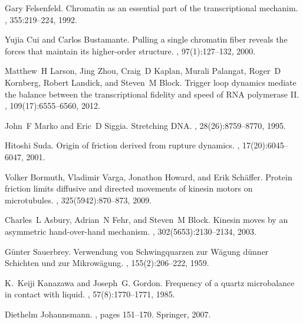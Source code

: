 \documentclass[floatfix,superscriptaddress,a4paper,twocolumn]{revtex4-1}
\begin{document}
\begin{thebibliography}{10}

Gary Felsenfeld.
\newblock Chromatin as an essential part of the transcriptional mechanim.
, 355:219--224, 1992.

Yujia Cui and Carlos Bustamante.
\newblock Pulling a single chromatin fiber reveals the forces that maintain its
  higher-order structure.
,
  97(1):127--132, 2000.

Matthew~H Larson, Jing Zhou, Craig~D Kaplan, Murali Palangat, Roger~D Kornberg,
  Robert Landick, and Steven~M Block.
\newblock Trigger loop dynamics mediate the balance between the transcriptional
  fidelity and speed of {RNA} polymerase {II}.
,
  109(17):6555--6560, 2012.

John~F Marko and Eric~D Siggia.
\newblock Stretching {DNA}.
, 28(26):8759--8770, 1995.

Hitoshi Suda.
\newblock Origin of friction derived from rupture dynamics.
, 17(20):6045--6047, 2001.

Volker Bormuth, Vladimir Varga, Jonathon Howard, and Erik Sch{\"a}ffer.
\newblock Protein friction limits diffusive and directed movements of kinesin
  motors on microtubules.
, 325(5942):870--873, 2009.

Charles~L Asbury, Adrian~N Fehr, and Steven~M Block.
\newblock Kinesin moves by an asymmetric hand-over-hand mechanism.
, 302(5653):2130--2134, 2003.

G{\"u}nter Sauerbrey.
\newblock Verwendung von {S}chwingquarzen zur {W}{\"a}gung d{\"u}nner
  {S}chichten und zur {M}ikrow{\"a}gung.
, 155(2):206--222, 1959.

K.~Keiji Kanazawa and Joseph~G. Gordon.
\newblock Frequency of a quartz microbalance in contact with liquid.
, 57(8):1770--1771, 1985.

Diethelm Johannsmann.
, pages 151--170.
\newblock Springer, 2007.


\end{thebibliography}
\end{document}
